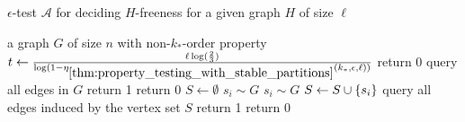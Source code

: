         \begin{algorithm}[H]
            \caption{$\epsilon$-test $\mathcal{A}$ for deciding $H$-freeness for a given graph $H$ of size $\ell$}
            \label{alg:h-freeness_tester}
            \begin{algorithmic}[1]
                \Require a graph $G$ of size $n$ with non-$k_*$-order property
                \State $t \leftarrow \frac{\ell \log( \frac{2}{3} )}
                    {\log( 1 - \eta_{\ref{thm:property_testing_with_stable_partitions}}(k_*, \epsilon, \ell) )}$
                    \State return 0 \label{line:G_smaller_then_H}
                    \State query all edges in $G$
                        \State return 1 \label{line:G_small_enough_found_H}
                    \Else
                        \State return 0 \label{line:G_small_enough_not_found_H}
                    \EndIf
                \Else \label{line:random_sampling}
                    \State $S \leftarrow \emptyset$
                        \State $s_{i} \sim G$
                            \State $s_{i} \sim G$
                        \EndWhile
                        \State $S \leftarrow S \cup \{ s_i \}$
                    \EndWhile
                    \State query all edges induced by the vertex set $S$
                        \State return 1 \label{line:found_H}
                    \Else
                        \State return 0 \label{line:not_found_H}
                    \EndIf
                \EndIf
            \end{algorithmic}
        \end{algorithm}

